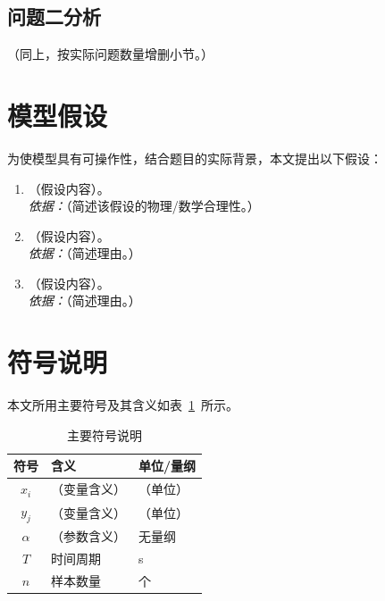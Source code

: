 \documentclass[12pt, a4paper]{article}
\begin{document}
\subsection{问题二分析}

（同上，按实际问题数量增删小节。）

\section{模型假设}

为使模型具有可操作性，结合题目的实际背景，本文提出以下假设：

\begin{enumerate}[label=\textbf{假设\arabic*：}, leftmargin=*]
    \item （假设内容）。\\
          \textit{依据：}（简述该假设的物理/数学合理性。）

    \item （假设内容）。\\
          \textit{依据：}（简述理由。）

    \item （假设内容）。\\
          \textit{依据：}（简述理由。）

\end{enumerate}

\section{符号说明}

本文所用主要符号及其含义如表~\ref{tab:symbols}~所示。

\begin{table}[H]
\centering
\caption{主要符号说明}
\label{tab:symbols}
\begin{tabular}{cll}
\toprule
\textbf{符号} & \textbf{含义} & \textbf{单位/量纲} \\
\midrule
$x_i$  & （变量含义）     & （单位） \\
$y_j$  & （变量含义）     & （单位） \\
$\alpha$ & （参数含义）   & 无量纲 \\
$T$    & 时间周期         & s \\
$n$    & 样本数量         & 个 \\
\bottomrule
\end{tabular}
\end{table}
\end{document}

